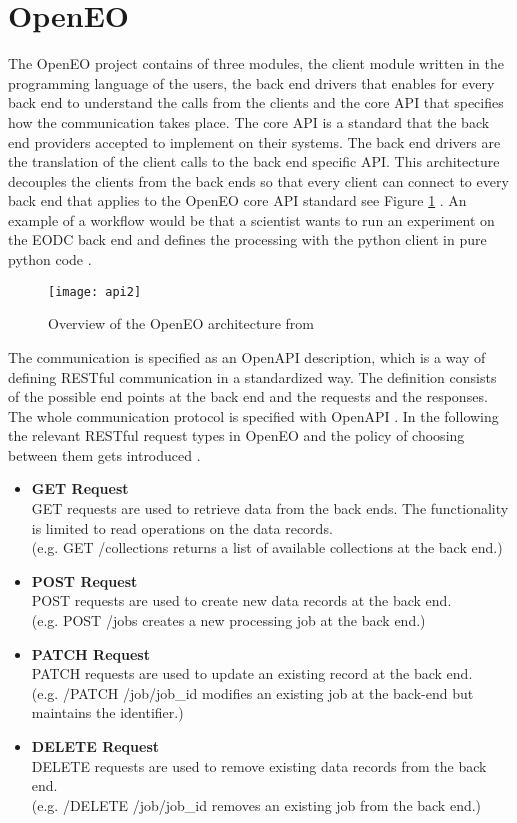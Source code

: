 \documentclass[draft,final]{vutinfth} %
\begin{document}
\section{OpenEO}\label{OpenEO}
The OpenEO project contains of three modules, the client module written in the programming language of the users, the back end drivers that enables for every back end to understand the calls from the clients and the core API that specifies how the communication takes place. The core API is a standard that the back end providers accepted to implement on their systems. The back end drivers are the translation of the client calls to the back end specific API. This architecture decouples the clients from the back ends so that every client can connect to every back end that applies to the OpenEO core API standard see Figure \ref{fig:api2} . An example of a workflow would be that a scientist wants to run an experiment on the EODC back end and defines the processing with the python client in pure python code \cite{openeo}.  

\begin{figure}[h]
	\centering
	\texttt{[image: api2]}
	\caption{Overview of the OpenEO architecture from \cite{openeo_github} }
	\label{fig:api2} %
\end{figure}


The communication is specified as an OpenAPI description, which is a way of defining RESTful communication in a standardized way. The definition consists of the possible end points at the back end and the requests and the responses. The whole communication protocol is specified with OpenAPI \cite{openapi}. 
In the following the relevant RESTful request types in OpenEO and the policy of choosing between them gets introduced \cite{openeo_github}.

\begin{itemize}
	\item \textbf{GET Request} \\
	GET requests are used to retrieve data from the back ends. The functionality is limited to read operations on the data records. \\(e.g. GET /collections returns a list of available collections at the back end.)
	\item \textbf{POST Request} \\ 
	POST requests are used to create new data records at the back end.  \\(e.g. POST /jobs creates a new processing job at the back end.)  
	\item \textbf{PATCH Request} \\
	PATCH requests are used to update an existing record at the back end. \\(e.g. /PATCH /job/{job\_id} modifies an existing job at the back-end but maintains the identifier.)
	\item \textbf{DELETE Request} \\ 
	DELETE requests are used to remove existing data records from the back end. \\(e.g. /DELETE /job/{job\_id} removes an existing job from the back end.)
\end{itemize}
\end{document}
